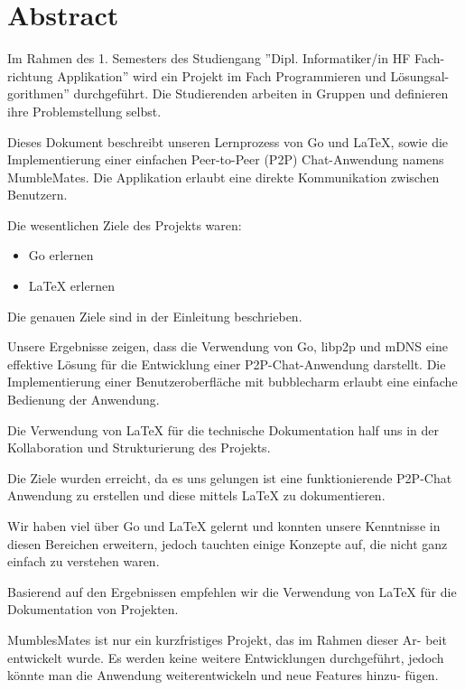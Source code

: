 \section*{Abstract}

Im Rahmen des 1. Semesters des Studiengang ”Dipl. Informatiker/in HF Fach-
richtung Applikation” wird ein Projekt im Fach Programmieren und Lösungsal-
gorithmen” durchgeführt. Die Studierenden arbeiten in Gruppen und definieren
ihre Problemstellung selbst.
\newline

Dieses Dokument beschreibt unseren Lernprozess von Go und LaTeX, sowie die Implementierung einer einfachen Peer-to-Peer (P2P) Chat-Anwendung namens MumbleMates. Die Applikation erlaubt eine direkte Kommunikation zwischen Benutzern.
\newline

Die wesentlichen Ziele des Projekts waren:
\begin{itemize}
    \item Go erlernen
    \item LaTeX erlernen
\end{itemize}

Die genauen Ziele sind in der Einleitung beschrieben.
\newline

Unsere Ergebnisse zeigen, dass die Verwendung von Go, libp2p und mDNS eine effektive Lösung für die Entwicklung einer P2P-Chat-Anwendung darstellt. Die Implementierung einer Benutzeroberfläche mit bubblecharm erlaubt eine einfache Bedienung der Anwendung.

Die Verwendung von LaTeX für die technische Dokumentation half uns in der Kollaboration und Strukturierung des Projekts.
\newline

Die Ziele wurden erreicht, da es uns gelungen ist eine funktionierende P2P-Chat Anwendung zu erstellen und diese mittels LaTeX zu dokumentieren.
\newline

Wir haben viel über Go und LaTeX gelernt und konnten unsere Kenntnisse
in diesen Bereichen erweitern, jedoch tauchten einige Konzepte auf,
die nicht ganz einfach zu verstehen waren.
\newline 

Basierend auf den Ergebnissen empfehlen wir die Verwendung von LaTeX
für die Dokumentation von Projekten.
\newline 

MumblesMates ist nur ein kurzfristiges Projekt, das im Rahmen dieser Ar-
beit entwickelt wurde. Es werden keine weitere Entwicklungen durchgeführt,
jedoch könnte man die Anwendung weiterentwickeln und neue Features hinzu-
fügen.

\newpage